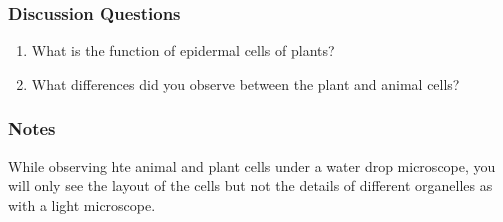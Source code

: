 \subsubsection*{Discussion Questions}
\begin{enumerate}
\item{What is the function of epidermal cells of plants?}
\item{What differences did you observe between the plant and animal cells?}
\end{enumerate}

\subsubsection*{Notes}
While observing hte animal and plant cells under a water drop microscope, you will only see the layout of the cells but not the details of different organelles as with a light microscope.
